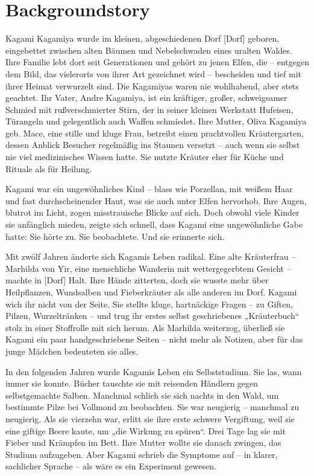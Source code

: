 \documentclass[12pt,a4paper]{article}
\begin{document}
\newpage

\section{Backgroundstory}

Kagami Kagamiya wurde im kleinen, abgeschiedenen Dorf [Dorf] geboren, eingebettet zwischen alten Bäumen und Nebelschwaden eines uralten Waldes. Ihre Familie lebt dort seit Generationen und gehört zu jenen Elfen, die – entgegen dem Bild, das vielerorts von ihrer Art gezeichnet wird – bescheiden und tief mit ihrer Heimat verwurzelt sind. Die Kagamiyas waren nie wohlhabend, aber stets geachtet. Ihr Vater, Andre Kagamiya, ist ein kräftiger, großer, schweigsamer Schmied mit rußverschmierter Stirn, der in seiner kleinen Werkstatt Hufeisen, Türangeln und gelegentlich auch Waffen schmiedet. Ihre Mutter, Oliva Kagamiya geb. Mace, eine stille und kluge Frau, betreibt einen prachtvollen Kräutergarten, dessen Anblick Besucher regelmäßig ins Staunen versetzt – auch wenn sie selbst nie viel medizinisches Wissen hatte. Sie nutzte Kräuter eher für Küche und Rituale als für Heilung.

Kagami war ein ungewöhnliches Kind – blass wie Porzellan, mit weißem Haar und fast durchscheinender Haut, was sie auch unter Elfen hervorhob. Ihre Augen, blutrot im Licht, zogen misstrauische Blicke auf sich. Doch obwohl viele Kinder sie anfänglich mieden, zeigte sich schnell, dass Kagami eine ungewöhnliche Gabe hatte: Sie hörte zu. Sie beobachtete. Und sie erinnerte sich.

Mit zwölf Jahren änderte sich Kagamis Leben radikal. Eine alte Kräuterfrau – Marhilda von Yir, eine menschliche Wanderin mit wettergegerbtem Gesicht – machte in [Dorf] Halt. Ihre Hände zitterten, doch sie wusste mehr über Heilpflanzen, Wundsalben und Fieberkräuter als alle anderen im Dorf. Kagami wich ihr nicht von der Seite. Sie stellte kluge, hartnäckige Fragen – zu Giften, Pilzen, Wurzeltränken – und trug ihr erstes selbst geschriebenes „Kräuterbuch“ stolz in einer Stoffrolle mit sich herum. Als Marhilda weiterzog, überließ sie Kagami ein paar handgeschriebene Seiten – nicht mehr als Notizen, aber für das junge Mädchen bedeuteten sie alles.

In den folgenden Jahren wurde Kagamis Leben ein Selbststudium. Sie las, wann immer sie konnte. Bücher tauschte sie mit reisenden Händlern gegen selbstgemachte Salben. Manchmal schlich sie sich nachts in den Wald, um bestimmte Pilze bei Vollmond zu beobachten. Sie war neugierig – manchmal zu neugierig. Als sie vierzehn war, erlitt sie ihre erste schwere Vergiftung, weil sie eine giftige Beere kaute, um „die Wirkung zu spüren“. Drei Tage lag sie mit Fieber und Krämpfen im Bett. Ihre Mutter wollte sie danach zwingen, das Studium aufzugeben. Aber Kagami schrieb die Symptome auf – in klarer, sachlicher Sprache – als wäre es ein Experiment gewesen.
\end{document}
